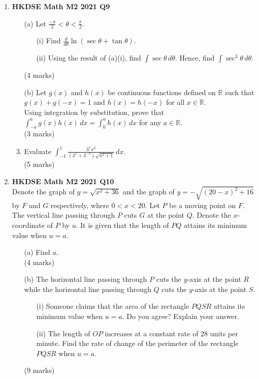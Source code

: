 \documentclass[12pt]{article}
\begin{document}
\begin{enumerate}
	\item \textbf{HKDSE Math M2 2021 Q9}
	\begin{enumerate}
		\item [(a)] Let $\displaystyle \frac{-\pi}{2} < \theta < \frac{\pi}{2}$.
		\begin{enumerate}
			\item [(i)] Find $\displaystyle \frac{d}{d\theta} \ln{(\sec{\theta} + \tan{\theta})}$.
			\item [(ii)] Using the result of (a)(i), find $\displaystyle \int \sec{\theta} \,d\theta$. Hence, find $\displaystyle \int \sec^3{\theta}\,d\theta$. 
		\end{enumerate}
		(4 marks)
		\item [(b)] Let $g(x)$ and $h(x)$ be continuous functions defined on $\mathbb{R}$ such that $g(x)+g(-x) =1$ and $h(x)=h(-x) $ for all $x \in \mathbb{R}$. \\Using integration by substitution, prove that $\displaystyle\int_{-a}^{a}g(x)h(x)\,dx = \int_{0}^{a}h(x)\,dx$ for any $a \in \mathbb{R}$.\\(3 marks)
		\item Evaluate $\displaystyle \int_{-1}^{1} \frac{3^x x^2}{(3^x+3^{-x})\sqrt{x^2+1}}\,dx$.\\(5 marks)
	\end{enumerate}


	\item \textbf{HKDSE Math M2 2021 Q10}\\
	Denote the graph of $y = \sqrt{x^2+36} $ and the graph of $y = - \sqrt{(20-x)^2+16}$ by $F$ and $G$ respectively, where $0 < x<20$. Let $P$ be a moving point on $F$. The vertical line passing through $P$ cuts $G$ at the point $Q$. Denote the $x$-coordinate of $P$ by $u$. It is given that the length of $PQ$ attains its minimum value when $u=a$.
	\begin{enumerate}
		\item [(a)] Find $a$.\\(4 marks)
		\item [(b)] The horizontal line passing through $P$ cuts the $y$-axis at the point $R$ while the horizontal line passing through $Q$ cuts the $y$-axis at the point $S$.
		\begin{enumerate}
			\item [(i)] Someone claims that the area of the rectangle $PQSR$ attains its minimum value when $u = a$. Do you agree? Explain your answer. 
			\item [(ii)] The length of $OP$ increases at a constant rate of 28 units per minute. Find the rate of change of the perimeter of the rectangle $PQSR$ when $u = a$.
		\end{enumerate}
		(9 marks)
	\end{enumerate}



\end{enumerate}
\end{document}
